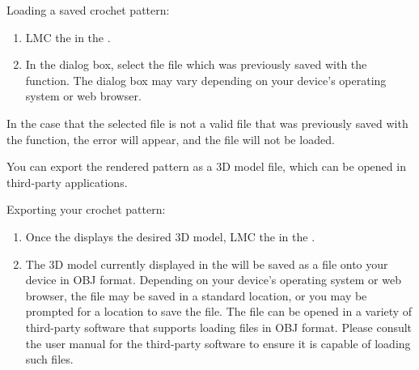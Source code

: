 \documentclass[main.tex]{subfiles}
\begin{document}
Loading a saved crochet pattern:
\begin{enumerate}
\item LMC the \UB{} in the \MenuBar.
\item In the dialog box, select the file which was previously saved with the  function. The dialog box may vary depending on your device's operating system or web browser.
\end{enumerate}
In the case that the selected file is not a valid file that was previously saved with the  function, the error  will appear, and the file will not be loaded.

You can export the rendered pattern as a 3D model file, which can be opened in third-party applications.

Exporting your crochet pattern:
\begin{enumerate}
\item Once the \CRW{} displays the desired 3D model, LMC the \EB{} in the \MenuBar.
\item The 3D model currently displayed in the \CRW{} will be saved as a file onto your device in OBJ format. Depending on your device's operating system or web browser, the file may be saved in a standard location, or you may be prompted for a location to save the file. The file can be opened in a variety of third-party software that supports loading files in OBJ format. Please consult the user manual for the third-party software to ensure it is capable of loading such files.
\end{enumerate}
\end{document}
